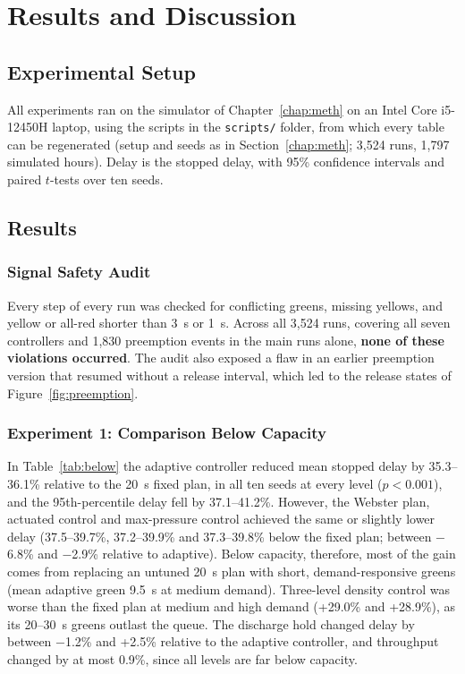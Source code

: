 \chapter{Results and Discussion}
\label{chap:results}

\section{Experimental Setup}
All experiments ran on the simulator of Chapter~\ref{chap:meth} on an Intel Core i5-12450H laptop, using the scripts in the \texttt{scripts/} folder, from which every table can be regenerated (setup and seeds as in Section~\ref{chap:meth}; 3,524 runs, 1,797 simulated hours). Delay is the stopped delay, with 95\% confidence intervals and paired $t$-tests over ten seeds.

\section{Results}

\subsection{Signal Safety Audit}
Every step of every run was checked for conflicting greens, missing yellows, and yellow or all-red shorter than 3~s or 1~s. Across all 3,524 runs, covering all seven controllers and 1,830 preemption events in the main runs alone, \textbf{none of these violations occurred}. The audit also exposed a flaw in an earlier preemption version that resumed without a release interval, which led to the release states of Figure~\ref{fig:preemption}.

\subsection{Experiment 1: Comparison Below Capacity}
In Table~\ref{tab:below} the adaptive controller reduced mean stopped delay by 35.3--36.1\% relative to the 20~s fixed plan, in all ten seeds at every level ($p<0.001$), and the 95th-percentile delay fell by 37.1--41.2\%. However, the Webster plan, actuated control and max-pressure control achieved the same or slightly lower delay (37.5--39.7\%, 37.2--39.9\% and 37.3--39.8\% below the fixed plan; between $-$6.8\% and $-$2.9\% relative to adaptive). Below capacity, therefore, most of the gain comes from replacing an untuned 20~s plan with short, demand-responsive greens (mean adaptive green 9.5~s at medium demand). Three-level density control was worse than the fixed plan at medium and high demand (+29.0\% and +28.9\%), as its 20--30~s greens outlast the queue. The discharge hold changed delay by between $-$1.2\% and +2.5\% relative to the adaptive controller, and throughput changed by at most 0.9\%, since all levels are far below capacity.

